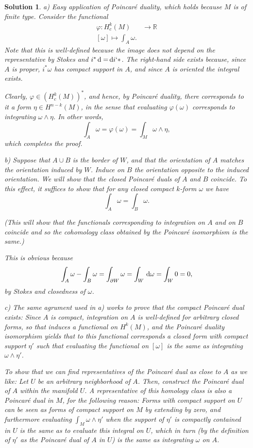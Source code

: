\documentclass{article}
\theoremstyle{nonumberplain}
\newtheorem{sol}{Solution}
\newcommand{\R}{\mathbb{R}}
\begin{document}
\begin{sol}
a) Easy application of Poincaré duality, which holds because $M$ is of finite type. Consider the functional
\begin{align*}
\varphi \colon H^k_c(M) &\to \R\\
[\omega] \mapsto \int_A \omega.
\end{align*}
Note that this is well-defined because the image does not depend on the representative by Stokes and $i^* \dl = \dl i^^ *$. The right-hand side exists because, since $A$ is proper, $i^* \omega$ has compact support in $A$, and since $A$ is oriented the integral exists.

Clearly, $\varphi \in (H^k_c(M))^*$, and hence, by Poincaré duality, there corresponds to it a form $\eta \in H^{n-k}(M)$, in the sense that evaluating $\varphi(\omega)$ corresponds to integrating $\omega \wedge \eta$. In other words,
\[\int_A \omega = \varphi(\omega) = \int_M \omega \wedge \eta,\]
which completes the proof.

\medskip

b) Suppose that $A \cup B$ is the border of $W$, \emph{and that the orientation of $A$ matches the orientation induced by $W$}. Induce on $B$ the orientation \emph{opposite} to the induced orientation. We will show that the closed Poincaré duals of $A$ and $B$ coincide. To this effect, it suffices to show that for any closed compact $k$-form $\omega$ we have
\[\int_A \omega = \int_B \omega.\]

(This will show that the functionals corresponding to integration on $A$ and on $B$ coincide and so the cohomology class obtained by the Poincaré isomorphism is the same.)

This is obvious because
\[\int_A \omega - \int_B \omega = \int_{\partial W} \omega = \int_W \dl \omega = \int_W 0 = 0,\]
by Stokes and closedness of $\omega$.

\medskip

c) The same agrument used in a) works to prove that the compact Poincaré dual exists: Since $A$ is compact, integration on $A$ is well-defined for arbitrary closed forms, so that induces a functional on $H^k(M)$, and the Poincaré duality isomorphism yields that to this functional corresponds a closed form with compact support $\eta'$ such that evaluating the functional on $[\omega]$ is the same as integrating $\omega \wedge \eta'$.

To show that we can find representatives of the Poincaré dual as close to $A$ as we like: Let $U$ be an arbitrary neighborhood of $A$. Then, construct the Poincaré dual of $A$ within the manifold $U$. A representative of this homology class is also a Poincaré dual in $M$, for the following reason: Forms with compact support on $U$ can be seen as forms of compact support on $M$ by extending by zero, and furthermore evaluating $\int_M \omega \wedge \eta'$ when the support of $\eta'$ is compactly contained in $U$ is the same as to evaluate this integral on $U$, which in turn (by the definition of $\eta'$ as the Poincaré dual of $A$ in $U$) is the same as integrating $\omega$ on $A$.


\end{sol}
\end{document}
